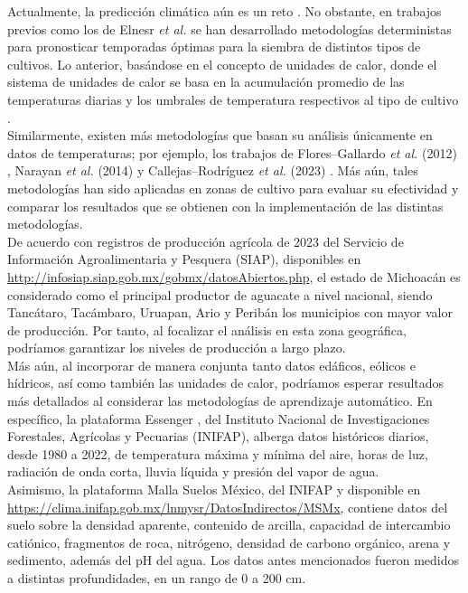 Actualmente, la predicción climática aún es un reto \cite{Materia_2024}. No obstante, en trabajos previos como los de Elnesr \textit{et al.} \cite{Elnesr_2016, Elnesr_2013} se han desarrollado metodologías deterministas para pronosticar temporadas óptimas para la siembra de distintos tipos de cultivos. Lo anterior, basándose en el concepto de unidades de calor, donde el sistema de unidades de calor se basa en la acumulación promedio de las temperaturas diarias y los umbrales de temperatura respectivos al tipo de cultivo \cite{Chen_1973}.\\

Similarmente, existen más metodologías que basan su análisis únicamente en datos de temperaturas; por ejemplo, los trabajos de Flores--Gallardo \textit{et al.} (2012) \cite{Flores-Gallardo_2012}, Narayan \textit{et al.} (2014) \cite{Narayan_2014} y Callejas--Rodríguez \textit{et al.} (2023) \cite{Callejas-Rodriguez_2023}. Más aún, tales metodologías han sido aplicadas en zonas de cultivo para evaluar su efectividad y comparar los resultados que se obtienen con la implementación de las distintas metodologías.\\



De acuerdo con registros de producción agrícola de 2023 del Servicio de Información Agroalimentaria y Pesquera (SIAP), disponibles en \url{http://infosiap.siap.gob.mx/gobmx/datosAbiertos.php}, el estado de Michoacán es considerado como el principal productor de aguacate a nivel nacional, siendo Tancátaro, Tacámbaro, Uruapan, Ario y Peribán los municipios con mayor valor de producción. Por tanto, al focalizar el análisis en esta zona geográfica, podríamos garantizar los niveles de producción a largo plazo.\\

Más aún, al incorporar de manera conjunta tanto datos edáficos, eólicos e hídricos, así como también las unidades de calor, podríamos esperar resultados más detallados al considerar las metodologías de aprendizaje automático. En específico, la plataforma Essenger \cite{Rodriguez-Moreno_2021}, del Instituto Nacional de Investigaciones Forestales, Agrícolas y Pecuarias (INIFAP), alberga datos históricos diarios, desde 1980 a 2022, de temperatura máxima y mínima del aire, horas de luz, radiación de onda corta, lluvia líquida y presión del vapor de agua.\\

Asimismo, la plataforma Malla Suelos México, del INIFAP y disponible en \url{https://clima.inifap.gob.mx/lnmysr/DatosIndirectos/MSMx}, contiene datos del suelo sobre la densidad aparente, contenido de arcilla, capacidad de intercambio catiónico, fragmentos de roca, nitrógeno, densidad de carbono orgánico, arena y sedimento, además del pH del agua. Los datos antes mencionados fueron medidos a distintas profundidades, en un rango de 0 a 200 cm.\\

